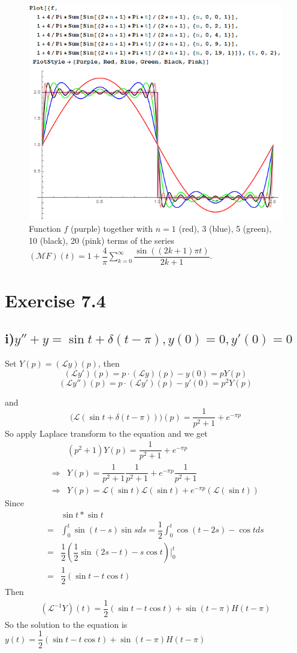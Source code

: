 \documentclass[a4paper,12pt,titlepage]{article}
\begin{document}
\begin{figure}[H]
    \centering
    \includegraphics[scale=1]{0.png}
    \caption{Function $f$ (purple) together with $n = 1$ (red), 3 (blue), 5 (green), 10 (black), 20 (pink) terms of the series $(\mathcal{M}F)(t)=1+\dfrac{4}{\pi}\sum\limits_{k=0}^{\infty}\dfrac{\sin((2k+1)\pi t)}{2k+1}$.}
\end{figure}

\section*{Exercise 7.4}
\subsection*{i)$y''+y=\sin t+\delta(t-\pi),y(0)=0,y'(0)=0$}
Set $Y(p)=(\mathcal{L}y)(p)$, then
$$(\mathcal{L}y')(p)=p\cdot(\mathcal{L}y)(p)-y(0)=pY(p) $$
$$(\mathcal{L}y'')(p)=p\cdot(\mathcal{L}y')(p)-y'(0)=p^2Y(p) $$

and
$$\Big(\mathcal{L}(\sin t+\delta(t-\pi))\Big)(p)=\dfrac{1}{p^2+1}+e^{-\pi p}$$
So apply Laplace transform to the equation and we get
\begin{align*}
&(p^2+1)Y(p)=\dfrac{1}{p^2+1}+e^{-\pi p}\\
\Rightarrow& Y(p)=\dfrac{1}{p^2+1}\dfrac{1}{p^2+1}+e^{-\pi p}\dfrac{1}{p^2+1}\\
\Rightarrow& Y(p)=\mathcal{L}(\sin t)\mathcal{L}(\sin t)+e^{-\pi p}(\mathcal{L}(\sin t))
\end{align*}
Since
\begin{align*}
&\sin t*\sin t\\
=&\int_0^t \sin (t-s)\sin sds =\dfrac{1}{2}\int_0^t \cos(t-2s)-\cos tds\\
=&\dfrac{1}{2}(\dfrac{1}{2}\sin(2s-t)-s\cos t)\Big|_{0}^{t}    \\
=&\dfrac{1}{2}(\sin t-t\cos t)
\end{align*}
Then 
\begin{align*}
(\mathcal{L}^{-1}Y)(t)=\dfrac{1}{2}(\sin t-t\cos t)+\sin(t-\pi)H(t-\pi)
\end{align*}
So the solution to the equation is $y(t)=\dfrac{1}{2}(\sin t-t\cos t)+\sin(t-\pi)H(t-\pi)$
\end{document}
